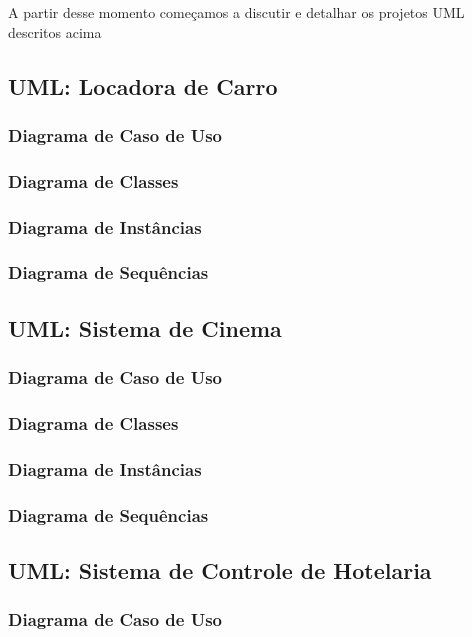\documentclass[a4paper,10pt]{article}
\begin{document}
A partir desse momento começamos a discutir e detalhar os projetos UML descritos acima

\subsection{UML: Locadora de Carro}

\subsubsection{Diagrama de Caso de Uso}
\subsubsection{Diagrama de Classes}
\subsubsection{Diagrama de Instâncias}
\subsubsection{Diagrama de Sequências}

\subsection{UML: Sistema de Cinema}

\subsubsection{Diagrama de Caso de Uso}
\subsubsection{Diagrama de Classes}
\subsubsection{Diagrama de Instâncias}
\subsubsection{Diagrama de Sequências}

\subsection{UML: Sistema de Controle de Hotelaria} 

\subsubsection{Diagrama de Caso de Uso}
\end{document}
